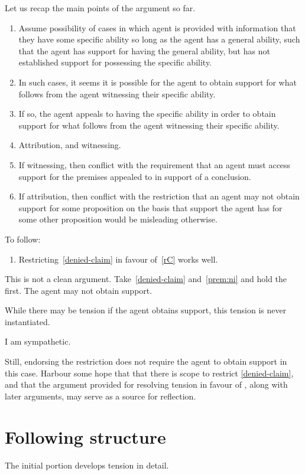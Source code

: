 \begin{note}
  Let us recap the main points of the argument so far.
  \begin{enumerate}
  \item Assume possibility of cases in which agent is provided with information that they have some specific ability so long as the agent has a general ability, such that the agent has support for having the general ability, but has not established support for possessing the specific ability.
  \item In such cases, it seems it is possible for the agent to obtain support for what follows from the agent witnessing their specific ability.
  \item If so, the agent appeals to having the specific ability in order to obtain support for what follows from the agent witnessing their specific ability.
  \item Attribution, and witnessing.
  \item If witnessing, then conflict with the requirement that an agent must access support for the premises appealed to in support of a conclusion.
  \item If attribution, then conflict with the restriction that an agent may not obtain support for some proposition on the basis that support the agent has for some other proposition would be misleading otherwise.
  \end{enumerate}

  To follow:
  \begin{enumerate}
  \item Restricting~\ref{denied-claim} in favour of~\ref{rC} works well.
  \end{enumerate}
\end{note}

\begin{note}
  This is not a clean argument.
  Take~\ref{denied-claim} and~\ref{prem:ni} and hold the first.
  The agent may not obtain support.

  While there may be tension if the agent obtains support, this tension is never instantiated.

  I am sympathetic.

  Still, endorsing the restriction does not require the agent to obtain support in this case.
  Harbour some hope that that there is scope to restrict \ref{denied-claim}, and that the argument provided for resolving tension in favour of \rC{}, along with later arguments, may serve as a source for reflection.
\end{note}

\section{Following structure}
\label{sec:following-structure}

\begin{note}[Structure]
  The initial portion develops tension in detail.
\end{note}